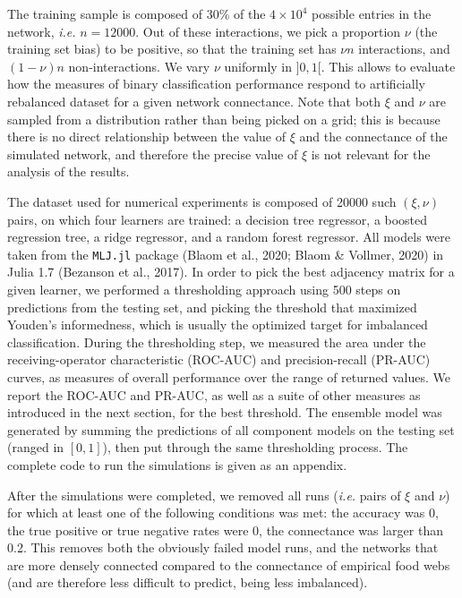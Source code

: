 \documentclass[11pt]{article}
\begin{document}
The training sample is composed of 30\% of the \(4\times 10^4\) possible
entries in the network, \emph{i.e.} \(n=12000\). Out of these
interactions, we pick a proportion \(\nu\) (the training set bias) to be
positive, so that the training set has \(\nu n\) interactions, and
\((1-\nu) n\) non-interactions. We vary \(\nu\) uniformly in \(]0,1[\).
This allows to evaluate how the measures of binary classification
performance respond to artificially rebalanced dataset for a given
network connectance. Note that both \(\xi\) and \(\nu\) are sampled from
a distribution rather than being picked on a grid; this is because there
is no direct relationship between the value of \(\xi\) and the
connectance of the simulated network, and therefore the precise value of
\(\xi\) is not relevant for the analysis of the results.

The dataset used for numerical experiments is composed of 20000 such
\((\xi, \nu)\) pairs, on which four learners are trained: a decision
tree regressor, a boosted regression tree, a ridge regressor, and a
random forest regressor. All models were taken from the \texttt{MLJ.jl}
package (Blaom et al., 2020; Blaom \& Vollmer, 2020) in Julia 1.7
(Bezanson et al., 2017). In order to pick the best adjacency matrix for
a given learner, we performed a thresholding approach using 500 steps on
predictions from the testing set, and picking the threshold that
maximized Youden's informedness, which is usually the optimized target
for imbalanced classification. During the thresholding step, we measured
the area under the receiving-operator characteristic (ROC-AUC) and
precision-recall (PR-AUC) curves, as measures of overall performance
over the range of returned values. We report the ROC-AUC and PR-AUC, as
well as a suite of other measures as introduced in the next section, for
the best threshold. The ensemble model was generated by summing the
predictions of all component models on the testing set (ranged in
\([0,1]\)), then put through the same thresholding process. The complete
code to run the simulations is given as an appendix.

After the simulations were completed, we removed all runs (\emph{i.e.}
pairs of \(\xi\) and \(\nu\)) for which at least one of the following
conditions was met: the accuracy was 0, the true positive or true
negative rates were 0, the connectance was larger than 0.2. This removes
both the obviously failed model runs, and the networks that are more
densely connected compared to the connectance of empirical food webs
(and are therefore less difficult to predict, being less imbalanced).
\end{document}
